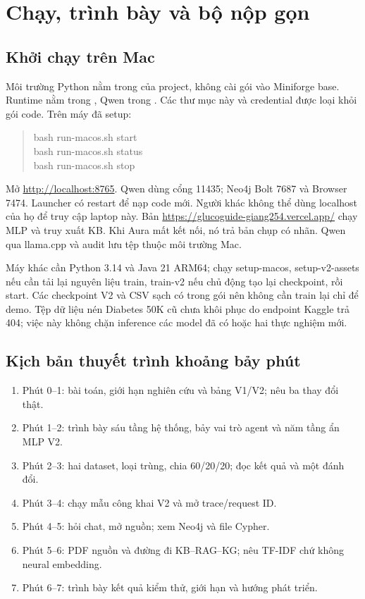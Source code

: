\chapter{Chạy, trình bày và bộ nộp gọn}
\section{Khởi chạy trên Mac}
Môi trường Python nằm trong  của project, không cài gói vào Miniforge base. Runtime nằm trong , Qwen trong . Các thư mục này và credential được loại khỏi gói code. Trên máy đã setup:
\begin{quote}\ttfamily bash run-macos.sh start\\bash run-macos.sh status\\bash run-macos.sh stop\end{quote}
Mở \url{http://localhost:8765}. Qwen dùng cổng 11435; Neo4j Bolt 7687 và Browser 7474. Launcher có restart để nạp code mới. Người khác không thể dùng localhost của họ để truy cập laptop này. Bản \url{https://glucoguide-giang254.vercel.app/} chạy MLP và truy xuất KB. Khi Aura mất kết nối, nó trả bản chụp có nhãn. Qwen qua llama.cpp và audit lưu tệp thuộc môi trường Mac.

Máy khác cần Python 3.14 và Java 21 ARM64; chạy setup-macos, setup-v2-assets nếu cần tải lại nguyên liệu train, train-v2 nếu chủ động tạo lại checkpoint, rồi start. Các checkpoint V2 và CSV sạch có trong gói nên không cần train lại chỉ để demo. Tệp dữ liệu nén Diabetes 50K cũ chưa khôi phục do endpoint Kaggle trả 404; việc này không chặn inference các model đã có hoặc hai thực nghiệm mới.

\section{Kịch bản thuyết trình khoảng bảy phút}
\begin{enumerate}
\item Phút 0--1: bài toán, giới hạn nghiên cứu và bảng V1/V2; nêu ba thay đổi thật.
\item Phút 1--2: trình bày sáu tầng hệ thống, bảy vai trò agent và năm tầng ẩn MLP V2.
\item Phút 2--3: hai dataset, loại trùng, chia 60/20/20; đọc kết quả và một đánh đổi.
\item Phút 3--4: chạy mẫu công khai V2 và mở trace/request ID.
\item Phút 4--5: hỏi chat, mở nguồn; xem Neo4j và file Cypher.
\item Phút 5--6: PDF nguồn và đường đi KB--RAG--KG; nêu TF-IDF chứ không neural embedding.
\item Phút 6--7: trình bày kết quả kiểm thử, giới hạn và hướng phát triển.
\end{enumerate}

